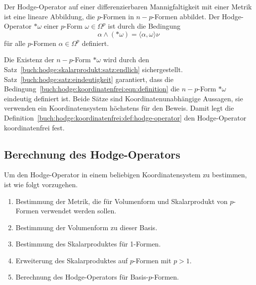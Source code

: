 \begin{definition}
\label{buch:hodge:koordinatenfrei:def:hodge-operator}
Der Hodge-Operator auf einer differenzierbaren Mannigfaltigkeit
mit einer Metrik ist eine lineare Abbildung, die $p$-Formen in
$n-p$-Formen abbildet.
Der Hodge-Operator $\ast\omega$ einer $p$-Form $\omega\in\Omega^p$
ist durch die Bedingung
\begin{equation}
\alpha \wedge (\ast\omega) = \langle \alpha,\omega\rangle \nu
\label{buch:hodge:koordinatenfrei:eqn:definition}
\end{equation}
für alle $p$-Formen $\alpha\in\Omega^p$ definiert.
\end{definition}

Die Existenz der $n-p$-Form $\ast\omega$ wird durch den
Satz~\ref{buch:hodge:skalarprodukt:satz:endlich} sichergestellt.
Satz~\ref{buch:hodge:satz:eindeutigkeit} garantiert, dass die
Bedingung~\eqref{buch:hodge:koordinatenfrei:eqn:definition}
die $n-p$-Form $\ast\omega$ eindeutig definiert ist.
Beide Sätze sind Koordinatenunabhängige Aussagen, sie verwenden
ein Koordinatensystem höchstens für den Beweis.
Damit legt die
Definition~\ref{buch:hodge:koordinatenfrei:def:hodge-operator}
den Hodge-Operator koordinatenfrei fest.

%
%
\subsection{Berechnung des Hodge-Operators}
Um den Hodge-Operator in einem beliebigen Koordinatensystem zu
bestimmen, ist wie folgt vorzugehen.
\begin{enumerate}
\item
Bestimmung der Metrik, die für Volumenform und Skalarprodukt
von $p$-Formen verwendet werden sollen.
\item
Bestimmung der Volumenform zu dieser Basis.
\item
Bestimmung des Skalarproduktes für 1-Formen.
\item
Erweiterung des Skalarproduktes auf $p$-Formen mit $p>1$.
\item
Berechnung des Hodge-Operators für Basis-$p$-Formen.
\end{enumerate}

%
%
